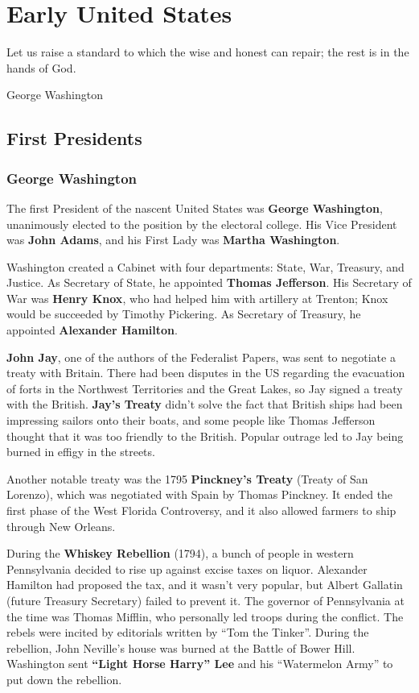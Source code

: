 \chapter{Early United States}

\epigraph{%
  Let us raise a standard to which the wise and honest can repair; the rest is in the hands of God.
}{George Washington}

\section{First Presidents}

\subsection*{George Washington}

The first President of the nascent United States was \textbf{George Washington},
unanimously elected to the position by the electoral college.
His Vice President was \textbf{John Adams},
and his First Lady was \textbf{Martha Washington}.

Washington created a Cabinet with four departments: State, War, Treasury, and Justice.
As Secretary of State, he appointed \textbf{Thomas Jefferson}.
His Secretary of War was \textbf{Henry Knox},
who had helped him with artillery at Trenton;
Knox would be succeeded by Timothy Pickering.
As Secretary of Treasury, he appointed \textbf{Alexander Hamilton}.

\textbf{John Jay}, one of the authors of the Federalist Papers,
was sent to negotiate a treaty with Britain.
There had been disputes in the US regarding the evacuation of forts
in the Northwest Territories and the Great Lakes,
so Jay signed a treaty with the British.
\textbf{Jay's Treaty}
didn't solve the fact that British ships had been impressing sailors onto their boats,
and some people like Thomas Jefferson thought that it was too friendly to the British.
Popular outrage led to Jay being burned in effigy in the streets.

Another notable treaty was the 1795 \textbf{Pinckney's Treaty} (Treaty of San Lorenzo),
which was negotiated with Spain by Thomas Pinckney.
It ended the first phase of the West Florida Controversy,
and it also allowed farmers to ship through New Orleans.

During the \textbf{Whiskey Rebellion} (1794),
a bunch of people in western Pennsylvania decided to rise up against excise taxes on liquor.
Alexander Hamilton had proposed the tax, and it wasn't very popular,
but Albert Gallatin (future Treasury Secretary) failed to prevent it.
The governor of Pennsylvania at the time was Thomas Mifflin,
who personally led troops during the conflict.
The rebels were incited by editorials written by ``Tom the Tinker''.
During the rebellion, John Neville's house was burned at the Battle of Bower Hill.
Washington sent \textbf{``Light Horse Harry'' Lee}
and his ``Watermelon Army'' to put down the rebellion.

